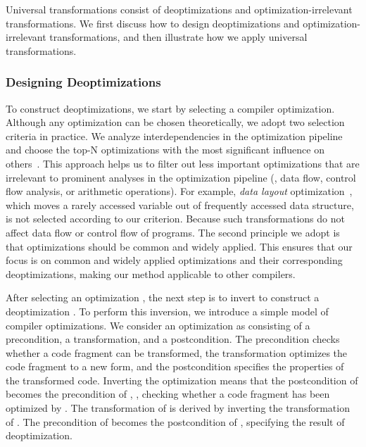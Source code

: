 Universal transformations consist of deoptimizations and optimization-irrelevant transformations.
We first discuss how to design deoptimizations and optimization-irrelevant transformations, and then illustrate how we apply universal transformations.





\subsubsection{Designing Deoptimizations}

To construct deoptimizations, we start by selecting a compiler optimization. Although any optimization can be chosen theoretically, we adopt two selection criteria in practice. We analyze interdependencies in the optimization pipeline and choose the top-N optimizations with the most significant influence on others~\cite{alfred2007compilers}. This approach helps us to filter out less important optimizations that are irrelevant to prominent analyses in the optimization pipeline (\eg, data flow, control flow analysis, or arithmetic operations). For example, \textit{data layout} optimization~\cite{prashantha2014implementing}, which moves a rarely accessed variable out of frequently accessed data structure, is not selected according to our criterion. Because such transformations do not affect data flow or control flow of programs. 
The second principle we adopt is that optimizations should be common and widely applied. This ensures that our focus is on common and widely applied optimizations and their corresponding deoptimizations, making our method applicable to other compilers. 

After selecting an optimization \opt, the next step is to invert \opt to construct a deoptimization \deopt. To perform this inversion, we introduce a simple model of compiler optimizations. We consider an optimization \opt as consisting of a precondition, a transformation, and a postcondition. The precondition checks whether a code fragment can be transformed, the transformation optimizes the code fragment to a new form, and the postcondition specifies the properties of the transformed code.
Inverting the optimization means that the postcondition of \opt becomes the precondition of \deopt, \ie, checking whether a code fragment has been optimized by \opt. The transformation of \deopt is derived by inverting the transformation of \opt. The precondition of \opt becomes the postcondition of \deopt, specifying the result of deoptimization.

